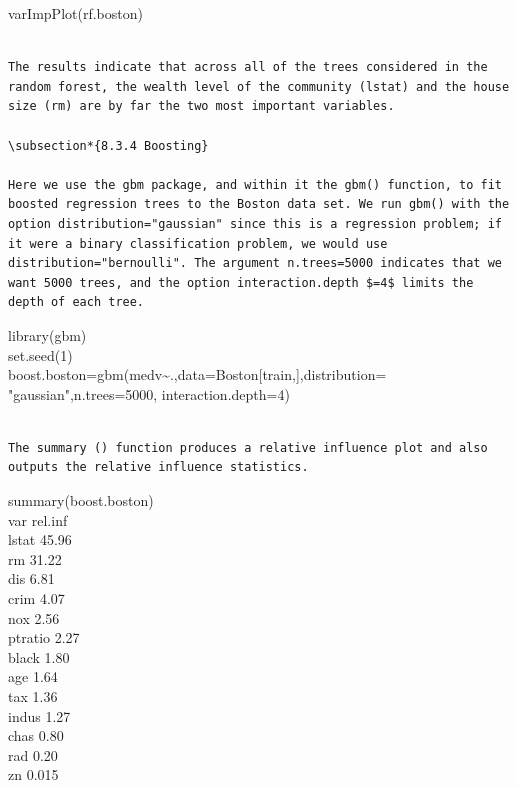 \documentclass[10pt]{article}
\begin{document}
\begin{displayquote}
varImpPlot(rf.boston)
\end{displayquote}

\begin{verbatim}

The results indicate that across all of the trees considered in the random forest, the wealth level of the community (lstat) and the house size (rm) are by far the two most important variables.

\subsection*{8.3.4 Boosting}

Here we use the gbm package, and within it the gbm() function, to fit boosted regression trees to the Boston data set. We run gbm() with the option distribution="gaussian" since this is a regression problem; if it were a binary classification problem, we would use distribution="bernoulli". The argument n.trees=5000 indicates that we want 5000 trees, and the option interaction.depth $=4$ limits the depth of each tree.
\end{verbatim}

\begin{displayquote}
library(gbm)\\
set.seed(1)\\[0pt]
boost.boston=gbm(medv\~{}.,data=Boston[train,],distribution=\\
"gaussian",n.trees=5000, interaction.depth=4)
\end{displayquote}

\begin{verbatim}

The summary () function produces a relative influence plot and also outputs the relative influence statistics.
\end{verbatim}

summary(boost.boston)\\
var rel.inf\\
lstat 45.96\\
rm 31.22\\
dis 6.81\\
crim 4.07\\
nox 2.56\\
ptratio 2.27\\
black 1.80\\
age 1.64\\
tax 1.36\\
indus 1.27\\
chas 0.80\\
rad 0.20\\
zn 0.015
\end{document}
